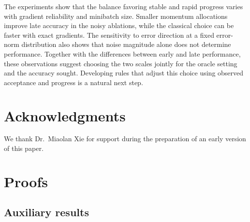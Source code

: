 \documentclass{article}
\begin{document}
The experiments show that the balance favoring stable and rapid progress varies with gradient reliability and minibatch size. Smaller momentum allocations improve late accuracy in the noisy ablations, while the classical choice can be faster with exact gradients. The sensitivity to error direction at a fixed error-norm distribution also shows that noise magnitude alone does not determine performance. Together with the differences between early and late performance, these observations suggest choosing the two scales jointly for the oracle setting and the accuracy sought. Developing rules that adjust this choice using observed acceptance and progress is a natural next step.

\section*{Acknowledgments}
We thank Dr.~Miaolan Xie for support during the preparation of an early
version of this paper.

\FloatBarrier
{}
{}



\clearpage
\appendix
\appendixnumbering
\appendixproofspacing
\section{Proofs}\label{app:proofs}
\subsection{Auxiliary results}
\end{document}
